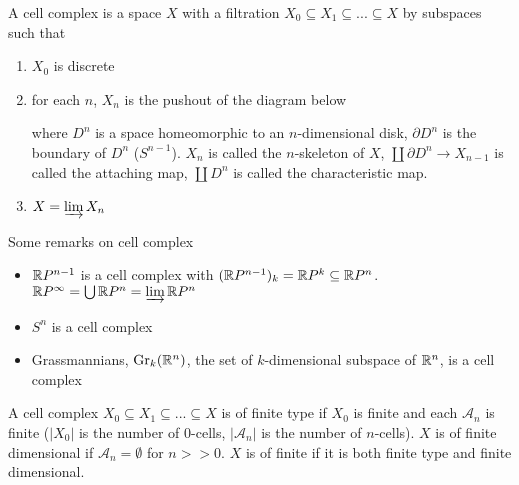 \documentclass{report}
\begin{document}
\begin{definition}
    A cell complex is a space $X$ with a filtration $X_0 \subseteq X_1 \subseteq ... \subseteq X$ by subspaces such that
    \begin{enumerate}
        \item $X_0$ is discrete
        
        \item for each $n$, $X_n$ is the pushout of the diagram below
        \begin{center}
        \end{center}
        where $D^n$ is a space homeomorphic to an $n$-dimensional disk, $\partial D^n$ is the boundary of $D^n$ ($S^{n-1}$). $X_n$ is called the $n$-skeleton of $X$, $\coprod \partial D^n \to X_{n-1}$ is called the attaching map, $\coprod D^n$ is called the characteristic map.
        
        \item $X = \varinjlim X_n$
    \end{enumerate}
\end{definition}

\begin{remark}
    Some remarks on cell complex
    \begin{itemize}
        \item $\mathbb{R} P^{n-1}$ is a cell complex with $(\mathbb{R} P^{n-1})_k = \mathbb{R} P^k \subseteq \mathbb{R} P^n$. $\mathbb{R} P^\infty = \bigcup \mathbb{R} P^n = \varinjlim \mathbb{R} P^n$
        
        \item $S^n$ is a cell complex

        \item Grassmannians, $\operatorname{Gr}_k(\mathbb{R}^n)$, the set of $k$-dimensional subspace of $\mathbb{R}^n$, is a cell complex
    \end{itemize}
\end{remark}

\begin{definition}
    A cell complex $X_0 \subseteq X_1 \subseteq ... \subseteq X$ is of finite type if $X_0$ is finite and each $\mathcal{A}_n$ is finite ($|X_0|$ is the number of $0$-cells, $|\mathcal{A}_n|$ is the number of $n$-cells). $X$ is of finite dimensional if $\mathcal{A}_n = \emptyset$ for $n >> 0$. $X$ is of finite if it is both finite type and finite dimensional.    
\end{definition}
\end{document}
